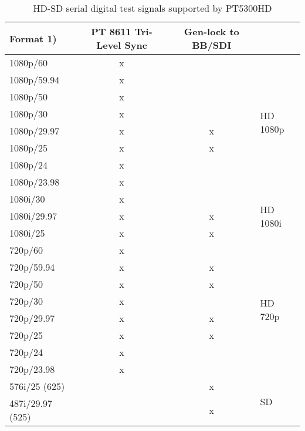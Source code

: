 \begin{table}[hbt]
\begin{tabular}{|l|c|c|p{0.5em}|}
\cline{1-3}
Format 1)			& PT 8611 Tri-Level Sync	& Gen-lock to BB/SDI  \\
\cline{1-3}
\hline
1080p/60			& x	& 	& \multirow{8}{*}{\begin{sideways}{\tiny HD 1080p}\end{sideways}} \\
\cline{1-3}
1080p/59.94		& x	&		& \\
\cline{1-3}
1080p/50			&	x	&		& \\
\cline{1-3}
1080p/30			&	x	&		& \\
\cline{1-3}
1080p/29.97		&	x	&	x	& \\
\cline{1-3}
1080p/25			&	x	&	x	& \\
\cline{1-3}
1080p/24			&	x	&		& \\
\cline{1-3}
1080p/23.98		&	x	&		& \\
\hline
\hline
1080i/30			& x	& 	& \multirow{3}{2cm}{\begin{sideways}{\tiny HD 1080i}\end{sideways}} \\
\cline{1-3}
1080i/29.97 	& x & x & \\
\cline{1-3}
1080i/25 			& x & x & \\
\hline
\hline
720p/60				& x	& 	& \multirow{8}{*}{\begin{sideways}{\tiny HD 720p}\end{sideways}} \\
\cline{1-3}
720p/59.94		& x	&	x	& \\
\cline{1-3}
720p/50				&	x	&	x	& \\
\cline{1-3}
720p/30				&	x	&		& \\
\cline{1-3}
720p/29.97		&	x	&	x	& \\
\cline{1-3}
720p/25				&	x	&	x	& \\
\cline{1-3}
720p/24				&	x	&		& \\
\cline{1-3}
720p/23.98		&	x	&		& \\
\hline
\hline
576i/25 (625)			& 	& x	& \multirow{2}{*}{\begin{sideways}{\tiny SD}\end{sideways}} \\
\cline{1-3}
487i/29.97 (525)	&		&	x	& \\
\hline
\end{tabular}
\caption{HD-SD serial digital test signals supported by PT5300HD}
\label{tab:8612formats}
\end{table}

